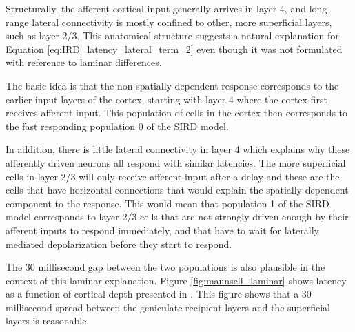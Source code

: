 \documentclass[phd,ianc,twoside]{infthesis}
\begin{document}
Structurally, the afferent cortical input generally arrives in layer 4,
and long-range lateral connectivity is mostly confined to other, more
superficial layers, such as layer 2/3. This anatomical structure
suggests a natural explanation for Equation
\ref{eq:IRD_latency_lateral_term_2} even though it was not formulated
with reference to laminar differences.

The basic idea is that the non spatially dependent response corresponds
to the earlier input layers of the cortex, starting with layer 4 where
the cortex first receives afferent input. This population of cells in
the cortex then corresponds to the fast responding population 0 of the
SIRD model.

In addition, there is little lateral connectivity in layer 4 which
explains why these afferently driven neurons all respond with similar
latencies. The more superficial cells in layer 2/3 will only receive
afferent input after a delay and these are the cells that have
horizontal connections that would explain the spatially dependent
component to the response. This would mean that population 1 of the SIRD
model corresponds to layer 2/3 cells that are not strongly driven enough
by their afferent inputs to respond immediately, and that have to wait
for laterally mediated depolarization before they start to respond.

The $30$ millisecond gap between the two populations is also plausible
in the context of this laminar explanation. Figure
\ref{fig:maunsell_laminar} shows latency as a function of cortical depth
presented in \citet{maunsell_jneurophys92}. This figure shows that a
$30$ millisecond spread between the geniculate-recipient layers and the
superficial layers is reasonable.
\end{document}
